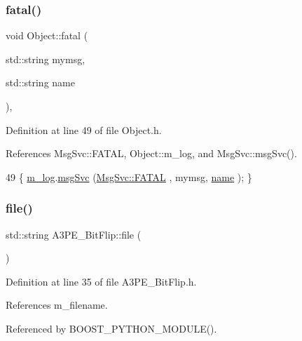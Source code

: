 \subsubsection{\texorpdfstring{fatal()}{fatal()}\hspace{0.1cm}{\footnotesize\ttfamily [2/2]}}
{\footnotesize\ttfamily void Object\+::fatal (\begin{DoxyParamCaption}\item[{std\+::string}]{mymsg,  }\item[{std\+::string}]{name }\end{DoxyParamCaption})\hspace{0.3cm}{\ttfamily [inline]}, {\ttfamily [inherited]}}



Definition at line 49 of file Object.\+h.



References Msg\+Svc\+::\+F\+A\+T\+AL, Object\+::m\+\_\+log, and Msg\+Svc\+::msg\+Svc().


\begin{DoxyCode}
49 \{ \hyperlink{classObject_a0d269813dd7ac1f24bc143031e2963f2}{m\_log}.\hyperlink{classMsgSvc_ad25f18047920cc59a314e5098259711c}{msgSvc} (\hyperlink{classMsgSvc_ae671eb7301996cd049d2da8a65925926a59c73cb29edfc9cdf35845e2b1301363}{MsgSvc::FATAL}   , mymsg, \hyperlink{classObject_a300f4c05dd468c7bb8b3c968868443c1}{name} ); \}
\end{DoxyCode}
\mbox{\label{classA3PE__BitFlip_ace874c555080ce6cb68b6bf320977a5a}} 
\subsubsection{\texorpdfstring{file()}{file()}}
{\footnotesize\ttfamily std\+::string A3\+P\+E\+\_\+\+Bit\+Flip\+::file (\begin{DoxyParamCaption}{ }\end{DoxyParamCaption})\hspace{0.3cm}{\ttfamily [inline]}}



Definition at line 35 of file A3\+P\+E\+\_\+\+Bit\+Flip.\+h.



References m\+\_\+filename.



Referenced by B\+O\+O\+S\+T\+\_\+\+P\+Y\+T\+H\+O\+N\+\_\+\+M\+O\+D\+U\+L\+E().



